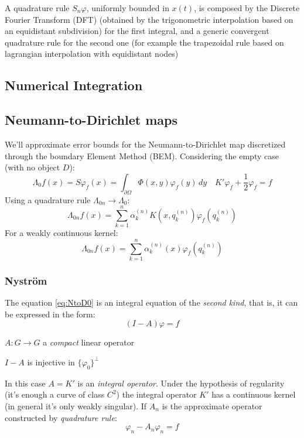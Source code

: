 \documentclass[10pt, a4paper, twoside, openright]{book}
\theoremstyle{definition}
\theoremstyle{plain}
\theoremstyle{plain}
\theoremstyle{plain}
\theoremstyle{plain}
\theoremstyle{plain}
\theoremstyle{plain}
\theoremstyle{plain}
\theoremstyle{plain}
\let\phi\varphi
\begin{document}
A quadrature rule $S_n\phi$, uniformly bounded in $x(t)$, is composed by the Discrete Fourier Transform (DFT) (obtained by the trigonometric interpolation based on an equidistant subdivision) for the first integral, and a generic convergent quadrature rule for the second one (for example the trapezoidal rule based on lagrangian interpolation with equidistant nodes) 

\subsection{Numerical Integration}
\subsection{Neumann-to-Dirichlet maps}
We'll approximate error bounds for the Neumann-to-Dirichlet map discretized through the boundary Element Method (BEM).
Considering the empty case (with no object $D$):
\begin{equation}
 \label{eq:NtoD0}
 \Lambda_0 f (x)= S\phi_f(x)=\int_{\partial\Omega}\Phi(x,y)\phi_f(y)\,dy \quad K'\phi_f+\frac{1}{2}\phi_f= f
\end{equation}
Using a quadrature rule $\Lambda_{0n} \to \Lambda_0$:
\begin{equation}
 \Lambda_{0n}f(x) = \sum_{k=1}^n\alpha_k^{(n)}K(x,q_k^{(n)})\phi_f(q_k^{(n)})
\end{equation}
For a weakly continuous kernel:
\begin{equation}
 \Lambda_{0n}f(x) = \sum_{k=1}^n\alpha_k^{(n)}(x)\phi_f(q_k^{(n)})
\end{equation}

\par
\subsubsection{Nystr\"om}
The equation \eqref{eq:NtoD0} is an integral equation of the \textit{second kind}, that is, it can be expressed in the form:
\begin{equation}
 (I - A) \phi = f
\end{equation}
\begin{center}
 $A: G \to G$ a \textit{compact} linear operator
\end{center}
\begin{center}
 $I-A$ is injective in $\{\phi_0\}^\perp$
\end{center}

In this case $A=K'$ is an \textit{integral operator}.
Under the hypothesis of regularity (it's enough a curve of class $C^2$) the integral operator $K'$ has a continuous kernel (in general it's only weakly singular).
If $A_n$ is the approximate operator constructed by \textit{quadrature rule}:
\begin{equation}
 \phi_n - A_n\phi_n = f
\end{equation}
\end{document}
